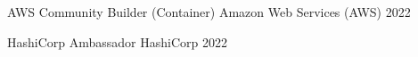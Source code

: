 

\begin{cvhonors}

  \cvhonor
    {AWS Community Builder (Container)} %
    {Amazon Web Services (AWS)} %
    {} %
    {2022} %

  \cvhonor
    {HashiCorp Ambassador} %
    {HashiCorp} %
    {} %
    {2022} %

\end{cvhonors}

